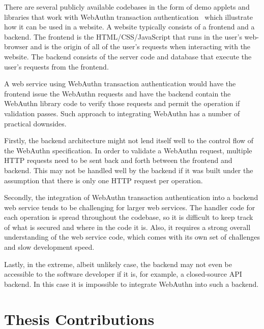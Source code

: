
There are several publicly available codebases in the form of demo applets and libraries that work with WebAuthn transaction authentication~\cite{webauthn-online-examples} which illustrate how it can be used in a website. A website typically consists of a frontend and a backend. The frontend is the HTML/CSS/JavaScript that runs in the user's web-browser and is the origin of all of the user's requests when interacting with the website. The backend consists of the server code and database that execute the user's requests from the frontend. 

A web service using WebAuthn transaction authentication would have the frontend issue the WebAuthn requests and have the backend contain the WebAuthn library code to verify those requests and permit the operation if validation passes. Such approach to integrating WebAuthn has a number of practical downsides. 


Firstly, the backend architecture might not lend itself well to the control flow of the WebAuthn specification. In order to validate a WebAuthn request, multiple HTTP requests need to be sent back and forth between the frontend and backend. This may not be handled well by the backend if it was built under the assumption that there is only one HTTP request per operation.

Secondly, the integration of WebAuthn transaction authentication into a backend web service tends to be challenging for larger web services. The handler code for each operation is spread throughout the codebase, so it is difficult to keep track of what is secured and where in the code it is. Also, it requires a strong overall understanding of the web service code, which comes with its own set of challenges and slow development speed.

Lastly, in the extreme, albeit unlikely case, the backend may not even be accessible to the software developer if it is, for example, a closed-source API backend. In this case it is impossible to integrate WebAuthn into such a backend.

\section{Thesis Contributions}

